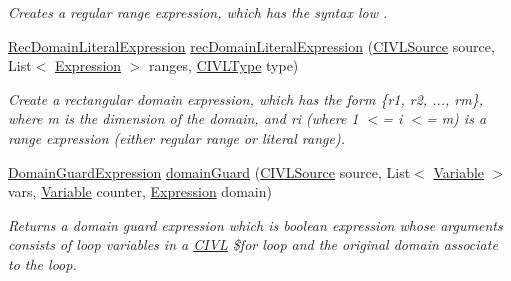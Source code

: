 \begin{DoxyCompactItemize}
\begin{DoxyCompactList}\small\item\em Creates a regular range expression, which has the syntax {\ttfamily low . }\end{DoxyCompactList}\item 
\hyperlink{interfaceedu_1_1udel_1_1cis_1_1vsl_1_1civl_1_1model_1_1IF_1_1expression_1_1RecDomainLiteralExpression}{Rec\+Domain\+Literal\+Expression} \hyperlink{interfaceedu_1_1udel_1_1cis_1_1vsl_1_1civl_1_1model_1_1IF_1_1ModelFactory_a27d8e99eb52ccab83ad7823512115a62}{rec\+Domain\+Literal\+Expression} (\hyperlink{interfaceedu_1_1udel_1_1cis_1_1vsl_1_1civl_1_1model_1_1IF_1_1CIVLSource}{C\+I\+V\+L\+Source} source, List$<$ \hyperlink{interfaceedu_1_1udel_1_1cis_1_1vsl_1_1civl_1_1model_1_1IF_1_1expression_1_1Expression}{Expression} $>$ ranges, \hyperlink{interfaceedu_1_1udel_1_1cis_1_1vsl_1_1civl_1_1model_1_1IF_1_1type_1_1CIVLType}{C\+I\+V\+L\+Type} type)
\begin{DoxyCompactList}\small\item\em Create a rectangular domain expression, which has the form {\ttfamily \{r1, r2, ..., rm\}}, where {\ttfamily m} is the dimension of the domain, and {\ttfamily ri (where 1 $<$= i $<$= m)} is a range expression (either regular range or literal range). \end{DoxyCompactList}\item 
\hyperlink{interfaceedu_1_1udel_1_1cis_1_1vsl_1_1civl_1_1model_1_1IF_1_1expression_1_1DomainGuardExpression}{Domain\+Guard\+Expression} \hyperlink{interfaceedu_1_1udel_1_1cis_1_1vsl_1_1civl_1_1model_1_1IF_1_1ModelFactory_aec9051152221128bcdda7ca1c05aa53a}{domain\+Guard} (\hyperlink{interfaceedu_1_1udel_1_1cis_1_1vsl_1_1civl_1_1model_1_1IF_1_1CIVLSource}{C\+I\+V\+L\+Source} source, List$<$ \hyperlink{interfaceedu_1_1udel_1_1cis_1_1vsl_1_1civl_1_1model_1_1IF_1_1variable_1_1Variable}{Variable} $>$ vars, \hyperlink{interfaceedu_1_1udel_1_1cis_1_1vsl_1_1civl_1_1model_1_1IF_1_1variable_1_1Variable}{Variable} counter, \hyperlink{interfaceedu_1_1udel_1_1cis_1_1vsl_1_1civl_1_1model_1_1IF_1_1expression_1_1Expression}{Expression} domain)
\begin{DoxyCompactList}\small\item\em Returns a domain guard expression which is boolean expression whose arguments consists of loop variables in a \hyperlink{classedu_1_1udel_1_1cis_1_1vsl_1_1civl_1_1CIVL}{C\+I\+V\+L} {\ttfamily \$for} loop and the original domain associate to the loop. \end{DoxyCompactList}\item 

\end{DoxyCompactItemize}
